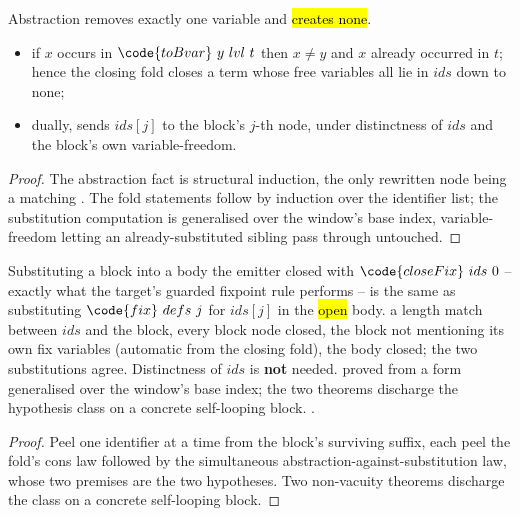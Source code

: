 \begin{lemma}
\label{lem:hasFVar_toBvar}
\leanok
{}
 Abstraction removes exactly one variable and \hl{creates none}.
\begin{itemize}
\item if $x$ occurs in $\code{toBvar}\ y\ lvl\ t$ then $x \neq y$ and $x$ already occurred in $t$;
hence the closing fold closes a term whose free variables all lie in $ids$ down to none;
\item dually,  sends $ids[j]$ to the block's $j$-th node, under distinctness of $ids$ and
the block's own variable-freedom.
\end{itemize}
\end{lemma}
\begin{proof}
\leanok
{}
 The abstraction fact is structural induction, the only rewritten node being a matching
. The fold statements follow by induction over the identifier list; the substitution
computation is generalised over the window's base index, variable-freedom letting an
already-substituted sibling pass through untouched.
\end{proof}

\begin{theorem}
\label{thm:closeFix_substList_fixSubst}
\leanok
{}
 Substituting a block into a body the emitter closed with $\code{closeFix}\ ids\ 0$ --
exactly what the target's guarded fixpoint rule performs -- is the same as substituting
$\code{fix}\ defs\ j$ for $ids[j]$ in the \hl{open} body.
 a length match between $ids$ and the block, every block node closed, the block not
mentioning its own fix variables (automatic from the closing fold), the body closed;  the two
substitutions agree. Distinctness of $ids$ is \textbf{not} needed.
 proved from a form generalised over the window's base index; the two  theorems
discharge the hypothesis class on a concrete self-looping block.
 \stProved{}.
\end{theorem}
\begin{proof}
\leanok
{}
 Peel one identifier at a time from the block's surviving suffix, each peel the fold's cons
law followed by the simultaneous abstraction-against-substitution law, whose two premises are the two
hypotheses. Two non-vacuity theorems discharge the class on a concrete self-looping block.
\end{proof}


